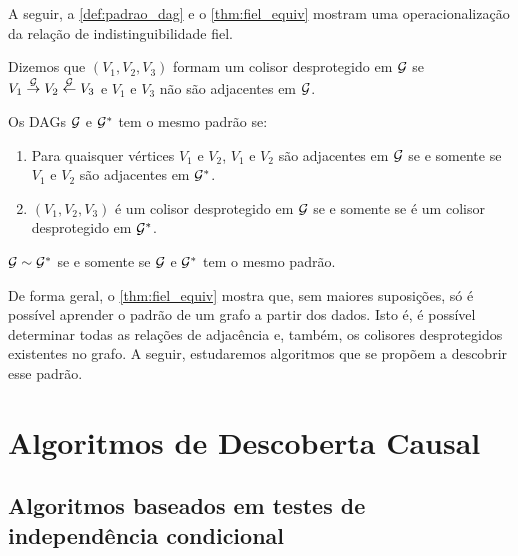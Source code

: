 A seguir, a \cref{def:padrao_dag} e
o \cref{thm:fiel_equiv} mostram 
uma operacionalização da 
relação de indistinguibilidade fiel.

\begin{definition}
 \label{def:colisor_desprotegido}
 Dizemos que $(V_1, V_2, V_3)$ formam
 um colisor desprotegido em ${\mathcal G}$ se
 $V_1 \stackrel{{\mathcal G}}{\rightarrow} V_2
 \stackrel{{\mathcal G}}{\leftarrow} V_3$ e
 $V_1$ e $V_3$ não são adjacentes em ${\mathcal G}$.
\end{definition}

\begin{definition}
 \label{def:padrao_dag}
 Os DAGs ${\mathcal G}$ e ${\mathcal G}^*$ tem o mesmo padrão se:
 \begin{enumerate}
  \item Para quaisquer vértices $V_1$ e $V_2$,
  $V_1$ e $V_2$ são adjacentes em ${\mathcal G}$ 
  se e somente se
  $V_1$ e $V_2$ são adjacentes em ${\mathcal G}^*$.
  \item $(V_1, V_2, V_3)$ é um colisor desprotegido em ${\mathcal G}$
  se e somente se é um colisor desprotegido em ${\mathcal G}^*$.
 \end{enumerate}
\end{definition}

\begin{theorem}
 \label{thm:fiel_equiv}
 ${\mathcal G} \sim {\mathcal G}^*$ se e somente se
 ${\mathcal G}$ e ${\mathcal G}^*$ tem o mesmo padrão.
\end{theorem}

De forma geral, 
o \cref{thm:fiel_equiv} mostra que,
sem maiores suposições,
só é possível aprender 
o padrão de um grafo a partir dos dados.
Isto é, é possível determinar todas
as relações de adjacência e, também,
os colisores desprotegidos existentes no grafo.
A seguir, estudaremos algoritmos que
se propõem a descobrir esse padrão.

\section{Algoritmos de Descoberta Causal}

\subsection{Algoritmos baseados em testes de independência condicional}


